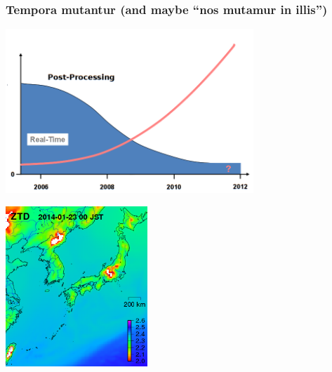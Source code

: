 \documentclass[10pt]{beamer}
\begin{document}

\begin{frame}
\frametitle{Tempora mutantur (and maybe ``nos mutamur in illis'')}

\includegraphics[width=0.7\textwidth,angle=0]{pp_vs_rt.png}

\vspace*{-2cm}
\hspace*{6cm}
\includegraphics[width=0.4\textwidth,angle=0]{ea_ztd_21h.png}


\end{frame}



\begin{frame}
\frametitle{}

\end{frame}


\begin{frame}
\frametitle{}

\end{frame}


\begin{frame}
\frametitle{}

\end{frame}
\end{document}
